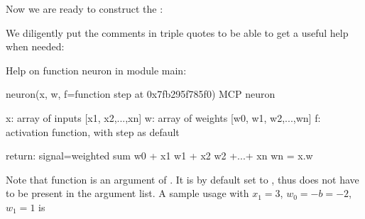 \documentclass[letterpaper,10pt,english]{jupyterBook}
\begin{document}
\sphinxAtStartPar
Now we are ready to construct the {\hyperref[\detokenize{docs/mcp:mcp1-fig}]{}}:

\begin{sphinxVerbatim}[commandchars=\\\{\}]
  

      
\end{sphinxVerbatim}

\sphinxAtStartPar
We diligently put the comments in triple quotes to be able to get a useful help when needed:

\begin{sphinxVerbatim}[commandchars=\\\{\}]
\end{sphinxVerbatim}

\begin{sphinxVerbatim}[commandchars=\\\{\}]
Help on function neuron in module \PYGZus{}\PYGZus{}main\PYGZus{}\PYGZus{}:

neuron(x, w, f=\PYGZlt{}function step at 0x7fb295f785f0\PYGZgt{})
    MCP neuron
    
    x: array of inputs  [x1, x2,...,xn]
    w: array of weights [w0, w1, w2,...,wn]
    f: activation function, with step as default
    
    return: signal=weighted sum w0 + x1 w1 + x2 w2 +...+ xn wn = x.w
\end{sphinxVerbatim}

\sphinxAtStartPar
Note that function  is an argument of . It is by default set to , thus does not have to be present in the argument list. A sample usage with \(x_1=3\), \(w_0=-b=-2\), \(w_1=1\) is
\end{document}
